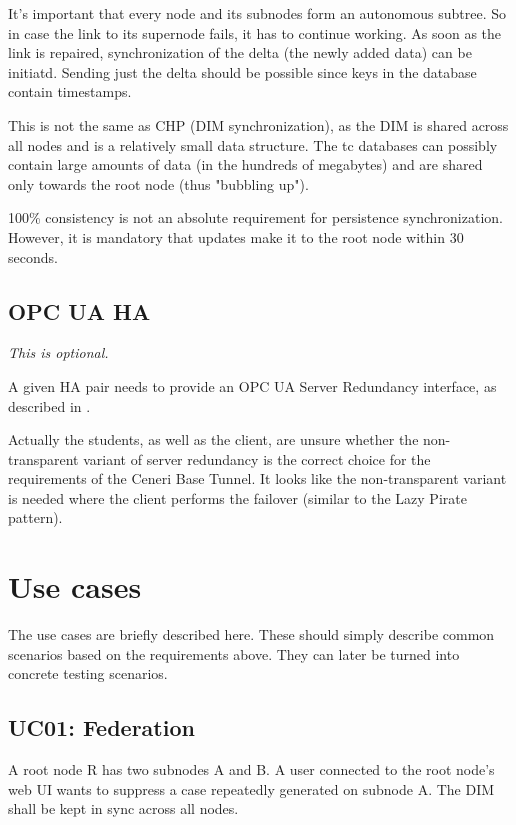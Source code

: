 It's important that every node and its subnodes form an autonomous subtree. So
in case the link to its supernode fails, it has to continue working. As soon as
the link is repaired, synchronization of the delta (the newly added data) can
be initiatd. Sending just the delta should be possible since keys in the
database contain timestamps.

This is not the same as \gls{CHP} (\gls{DIM} synchronization), as the DIM is shared across
all nodes and is a relatively small data structure. The \gls{tc} databases
can possibly contain large amounts of data (in the hundreds of megabytes) and
are shared only towards the root node (thus "bubbling up").

100\% consistency is not an absolute requirement for persistence synchronization.
However, it is mandatory that updates make it to the root node within 30 seconds.

\subsection{OPC UA HA}
\emph{This is optional.}

A given \gls{HA} pair needs to provide an OPC UA Server Redundancy interface,
as described in \cite[6.4.2.4 Non-transparent Redundancy,
p.~96]{opc-ua:behavior:server-redundancy}.

{\large\color{red}Actually the students, as well as the client, are unsure whether the
non-transparent variant of server redundancy is the correct choice for the
requirements of the Ceneri Base Tunnel. It looks like the non-transparent
variant is needed where the client performs the
failover (similar to the Lazy Pirate pattern).}

\section{Use cases}
The use cases are briefly described here. These should simply describe common
scenarios based on the requirements above. They can later be turned into
concrete testing scenarios.

\subsection{UC01: Federation}
A root node R has two subnodes A and B. A user connected to the root node's web
UI wants to suppress a case repeatedly generated on subnode A. The DIM shall be
kept in sync across all nodes.

